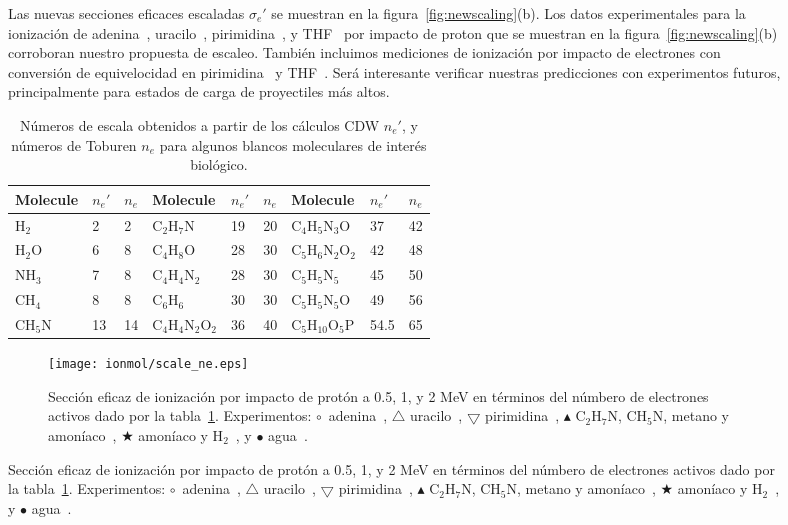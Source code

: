 \begin{figure}
Las nuevas secciones eficaces escaladas $\sigma_{e}'$ se muestran en la
figura~\ref{fig:newscaling}(b). Los datos experimentales para la 
ionización de adenina~\cite{iriki2011}, uracilo~\cite{itoh2013}, 
pirimidina~\cite{wolff2014}, y THF~\cite{wang2016} por impacto de proton 
que se muestran en la figura~\ref{fig:newscaling}(b) corroboran nuestro
propuesta de escaleo. También incluimos mediciones de ionización por 
impacto de electrones con conversión de equivelocidad en 
pirimidina~\cite{bug2017} y THF~\cite{bug2017,wolf2019,fuss2009}. 
Será interesante verificar nuestras predicciones con experimentos 
futuros, principalmente para estados de carga de proyectiles más altos.

\begin{table}
\begin{center}
\begin{tabular}{|p{}p{}p{}|
p{}p{}p{}|
p{}p{}p{}|}
\hline
 Molecule & $n_e'$ & $n_e$ & Molecule          & $n_e'$ & $n_e$ & Molecule             & $n_e'$ & $n_e$ \\
\hline
 H$_2$    & 2 & 2   & C$_2$H$_7$N         & 19 & 20 & C$_4$H$_5$N$_3$O     & 37 & 42 \\
 H$_2$O   & 6 & 8   & C$_4$H$_8$O         & 28 & 30 & C$_5$H$_6$N$_2$O$_2$ & 42 & 48 \\
 NH$_3$   & 7 & 8   & C$_4$H$_4$N$_2$     & 28 & 30 & C$_5$H$_5$N$_5$      & 45 & 50 \\
 CH$_4$   & 8 & 8   & C$_6$H$_6$          & 30 & 30 & C$_5$H$_5$N$_5$O     & 49 & 56 \\
 CH$_5$N  & 13 & 14 & C$_4$H$_4$N$_2$O$_2$& 36 & 40 & C$_5$H$_{10}$O$_5$P  & 54.5 & 65 \\
 \hline
\end{tabular}
\caption[Números de escala CDW y números de escala de Toburen.]
{Números de escala obtenidos a partir de los cálculos CDW $n_e'$, y 
números de Toburen $n_e$ para algunos blancos moleculares de interés 
biológico.}
\label{nn}
\end{center}
\end{table}

\begin{figure}
\centering
\texttt{[image: ionmol/scale\_ne.eps]}
\caption[Sección eficaz de ionización por impacto de protón en términos de
$n_e$.]
{Sección eficaz de ionización por impacto de protón a 0.5, 1,
y 2 MeV en términos del númbero de electrones activos dado por la 
tabla~\ref{nn}. Experimentos: 
\mbox{\Large$\circ$}~adenina~\cite{iriki2011}, 
$\triangle$ uracilo~\cite{itoh2013}, 
$\bigtriangledown$ pirimidina~\cite{wolff2014}, 
$\blacktriangle$ C$_2$H$_7$N, CH$_5$N, metano y amoníaco~\cite{lynch1976},
\mbox{\scriptsize$\bigstar$} amoníaco y H$_2$~\cite{rudd1985}, y 
\mbox{\Large$\bullet$} agua~\cite{luna2007}.}
\label{fig:recta}
\end{figure}


\end{figure}
